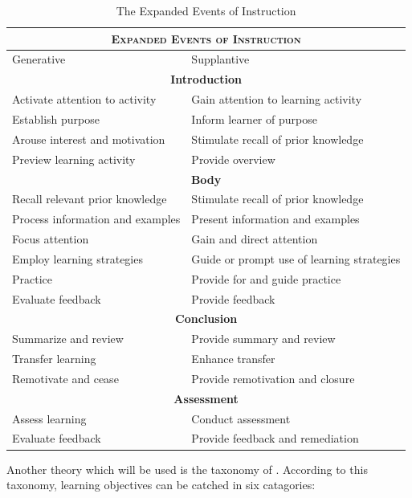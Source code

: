 \documentclass[12pt]{report} %
\begin{document}
\begin{table}
\begin{tabular}{| p{7cm} | p{7cm} |}
\hline
\multicolumn{2}{|c|}{\scshape Expanded Events of Instruction}\\ \hline
Generative & Supplantive \\ \hline
\multicolumn{2}{|c|}{\textbf{Introduction}} \\ \hline
Activate attention to activity & Gain attention to learning activity \\ \hline
Establish purpose & Inform learner of purpose \\ \hline
Arouse interest and motivation & Stimulate recall of prior knowledge \\ \hline
Preview learning activity & Provide overview \\ \hline
\multicolumn{2}{|c|}{\textbf{Body}} \\ \hline
Recall relevant prior knowledge & Stimulate recall of prior knowledge \\ \hline
Process information and examples & Present information and examples \\ \hline
Focus attention & Gain and direct attention \\ \hline
Employ learning strategies & Guide or prompt use of learning strategies \\ \hline
Practice & Provide for and guide practice \\ \hline
Evaluate feedback & Provide feedback \\ \hline
\multicolumn{2}{|c|}{\textbf{Conclusion}} \\ \hline
Summarize and review & Provide summary and review \\ \hline
Transfer learning & Enhance transfer \\ \hline
Remotivate and cease & Provide remotivation and closure \\ \hline
\multicolumn{2}{|c|}{\textbf{Assessment}} \\ \hline
Assess learning & Conduct assessment \\ \hline
Evaluate feedback & Provide feedback and remediation \\ \hline
\end{tabular}
\caption{\footnotesize The Expanded Events of Instruction \protect \cite{smithragan} \label{tab:eventsinstruction}}
\end{table}

Another theory which will be used is the taxonomy of . According to this taxonomy, learning objectives can be catched in six catagories:
\end{document}
